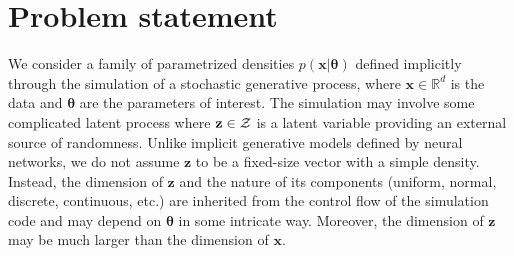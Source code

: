 \documentclass[twocolumn,superscriptaddress,aps]{revtex4-1}
\newcommand{\bftheta}{{\bm \theta}}
\newcommand{\bfx}{\mathbf{x}}
\newcommand{\bfz}{\mathbf{z}}
\theoremstyle{plain}
\begin{document}

\section{Problem statement}
\label{sec:problem}

We consider a family of parametrized densities $p(\mathbf{x}|\bftheta)$
defined implicitly through the simulation of a stochastic generative process,
where $\mathbf{x} \in \mathbb{R}^d$ is the data and $\bftheta$ are the
parameters of interest. The simulation may involve some complicated latent
process
where $\bfz \in {\cal Z}$ is a latent variable providing an external
source of randomness.
Unlike implicit generative models defined by neural networks, we do not assume
$\bfz$ to be a fixed-size vector with a simple density. Instead, the
dimension of $\bfz$ and the nature of its components (uniform, normal,
discrete, continuous, etc.) are inherited from the control flow of the
simulation code and may depend on $\bftheta$ in some intricate way. Moreover,
the dimension of $\bfz$ may be much larger than the dimension of
$\bfx$.

\end{document}
